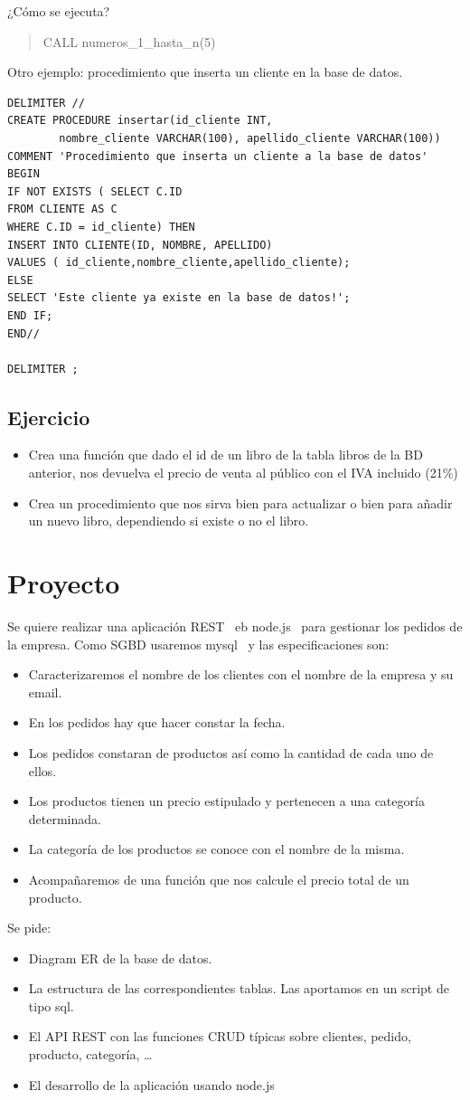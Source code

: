 \documentclass[4paper]{article}
\newcommand{\M}{mysql}
\newcommand{\R}{REST}
\newcommand{\N}{node.js}
\begin{document}
¿Cómo se ejecuta?
\begin{quote}
CALL numeros\_1\_hasta\_n(5)
\end{quote}
Otro ejemplo: procedimiento que inserta un cliente en la base de datos.
\begin{verbatim}
DELIMITER //
CREATE PROCEDURE insertar(id_cliente INT,
        nombre_cliente VARCHAR(100), apellido_cliente VARCHAR(100))
COMMENT 'Procedimiento que inserta un cliente a la base de datos'
BEGIN
IF NOT EXISTS ( SELECT C.ID 
FROM CLIENTE AS C 
WHERE C.ID = id_cliente) THEN
INSERT INTO CLIENTE(ID, NOMBRE, APELLIDO)
VALUES ( id_cliente,nombre_cliente,apellido_cliente);
ELSE
SELECT 'Este cliente ya existe en la base de datos!';
END IF;
END//

DELIMITER ;
\end{verbatim}

\subsection{Ejercicio}
\begin{itemize}
\item Crea una función que dado el id de un libro de la tabla libros de la BD anterior, nos devuelva el precio de venta al público con el IVA incluido (21\%)
\item Crea un procedimiento que nos sirva bien para actualizar o bien para añadir un nuevo libro, dependiendo si existe o no el libro.
\end{itemize}

\section{Proyecto}
Se quiere realizar una aplicación \R ~ eb \N ~ para gestionar los pedidos de la empresa. Como SGBD usaremos \M ~ y las especificaciones son:
\begin{itemize}
\item Caracterizaremos el nombre de los clientes con el nombre de la empresa y su email.
\item En los pedidos hay que hacer constar la fecha.
\item Los pedidos constaran de productos así como la cantidad de cada uno de ellos.
\item Los productos tienen un precio estipulado y pertenecen a una categoría determinada.
\item La categoría de los productos se conoce con el nombre de la misma.
\item Acompañaremos de una función que nos calcule el precio total de un producto.
\end{itemize}
Se pide:
\begin{itemize}
\item Diagram ER de la base de datos.
\item La estructura de las correspondientes tablas. Las aportamos en un script de tipo sql.
\item El API REST con las funciones CRUD típicas sobre clientes, pedido, producto, categoría, \dots
\item El desarrollo de la aplicación usando \N
\end{itemize}
\end{document}
